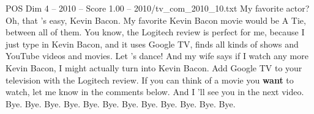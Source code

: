 \begin{textsample}{POS Dim 4 – 2010 – Score 1.00 – 2010/tv\_com\_2010\_10.txt}  \label{ex:f4_pos_053}
My favorite actor?
Oh, that 's easy, Kevin Bacon.
My favorite Kevin Bacon movie would be A Tie, between all of them.
You know, the Logitech review is perfect for me, because I just type in Kevin Bacon, and it uses Google TV, finds all kinds of shows and YouTube videos and movies.
Let 's dance!
And my wife says if I watch any more Kevin Bacon, I might actually turn into Kevin Bacon.
Add Google TV to your television with the Logitech review.
If you can think of a movie you \textbf{want} to watch, let me know in the comments below.
And I 'll see you in the next video.
Bye.
Bye.
Bye.
Bye.
Bye.
Bye.
Bye.
Bye.
Bye.
Bye.
Bye.
Bye.

\end{textsample}
